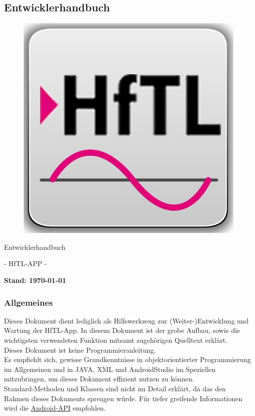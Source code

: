 \newpage
\subsection{Entwicklerhandbuch}

\begin{figure}[h]
	\centering
	\includegraphics[scale=0.5]{03_Bedienungsanleitung/img/Logo_HFTl_App.jpg}
	\label{img:grafik-dummy}
\end{figure}

\begin{center}
	{\huge Entwicklerhandbuch}
\end{center}

\begin{center}
	{\huge -  HfTL-APP  -}
\end{center}

\begin{center}
	\textbf{{\large Stand: {\today}}}
\end{center}

\newpage
\tableofcontents
\newpage

\subsubsection{Allgemeines}
Dieses Dokument dient lediglich als Hilfswerkzeug zur (Weiter-)Entwicklung und Wartung der HfTL-App. In diesem Dokument ist der grobe Aufbau, sowie die wichtigsten verwendeten Funktion mitsamt zugehörigen Quelltext erklärt.
\\[1em]
Dieses Dokument ist keine Programmieranleitung.
\\[1em]
Es empfiehlt sich, gewisse Grundkenntnisse in objektorientierter Programmierung im Allgemeinen und  in JAVA, XML und AndroidStudio im Speziellen mitzubringen, um dieses Dokument effizient nutzen zu können.
\\[1em]
Standard-Methoden und Klassen sind nicht im Detail erklärt, da das den Rahmen dieses Dokuments sprengen würde. Für tiefer greifende Informationen wird die \href{http://developer.android.com/reference/packages.html}{Android-API} empfohlen.
\newpage
